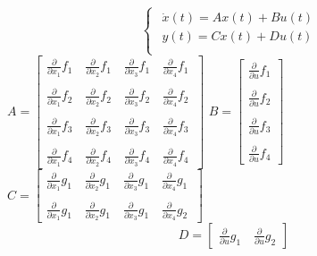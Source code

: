 \begin{center}
	$$
	\begin{cases}
		\begin{array}{c}
		\dot{x}\left(t\right) = Ax(t) + Bu(t)\\
		y\left(t\right) = Cx(t) + Du(t)\\
		\end{array}
	\end{cases}
	$$
	$
	A=\left\lbrack
	\begin{array}{cccc}
		\frac{\partial }{\partial x_1 }f_{1\;}  & \frac{\partial }{\partial x_2 }f_{1\;}  & \frac{\partial }{\partial x_3 }f_{1\;}  & \frac{\partial }{\partial x_4 }f_{1\;} \\\\
		\frac{\partial }{\partial x_1 }f_{2\;}  & \frac{\partial }{\partial x_2 }f_{2\;}  & \frac{\partial }{\partial x_3 }f_{2\;}  & \frac{\partial }{\partial x_4 }f_{2\;} \\\\
		\frac{\partial }{\partial x_1 }f_3  & \frac{\partial }{\partial x_2 }f_3  & \frac{\partial }{\partial x_3 }f_3  & \frac{\partial }{\partial x_4 }f_3 \\\\
		\frac{\partial }{\partial x_1 }f_4  & \frac{\partial }{\partial x_2 }f_4  & \frac{\partial }{\partial x_3 }f_4  & \frac{\partial }{\partial x_4 }f_4 
	\end{array}\right\rbrack
	$
	$
	B=\left\lbrack 
	\begin{array}{c}
		\frac{\partial }{\partial u}f_1 \\\\
		\frac{\partial }{\partial u}f_2 \\\\
		\frac{\partial }{\partial u}f_3 \\\\
		\frac{\partial }{\partial u}f_4 
	\end{array}\right\rbrack
	$
	$
	C=\left\lbrack 
	\begin{array}{cccc}
		\frac{\partial }{\partial x_1 }g_{1\;}  & \frac{\partial }{\partial x_2 }g_{1\;}  & \frac{\partial }{\partial x_3 }g_{1\;}  & \frac{\partial }{\partial x_4 }g_{1\;} \\\\
		\frac{\partial }{\partial x_1 }g_{1\;}  & \frac{\partial }{\partial x_2 }g_{1\;}  & \frac{\partial }{\partial x_3 }g_{1\;}  & \frac{\partial }{\partial x_4 }g_2 
	\end{array}\right\rbrack
	$
	$$
	\;D=\left\lbrack \begin{array}{cc}
		\frac{\partial }{\partial u}g_{1\;}  & \frac{\partial }{\partial u}g_2 
	\end{array}\right\rbrack
	$$
\end{center}

